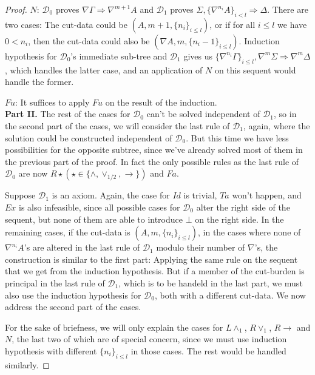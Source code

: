 \documentclass[12pt,a4paper]{article}
\begin{document}
\begin{proof}
 $N$: $\mathcal{D}_0$ proves $\nabla \Gamma \Rightarrow \nabla^{m+1} A$ and $\mathcal{D}_1$ proves $\Sigma, \{\nabla^{n_i} A\}_{i<l} \Rightarrow \Delta$. There are two cases: The cut-data could be $(A, m+1, \{n_i\}_{i \leq l})$, or if for all $i \leq l$ we have $0 < n_i$, then the cut-data could also be $(\nabla A, m, \{n_i-1\}_{i \leq l})$. Induction hypothesis for $\mathcal{D}_0$'s immediate sub-tree and $\mathcal{D}_1$ gives us $\{\nabla^{n_i}\Gamma\}_{i \leq l}, \nabla^m \Sigma \Rightarrow \nabla^m \Delta$, which handles the latter case, and an application of $N$ on this sequent would handle the former.

 $Fu$: It suffices to apply $Fu$ on the result of the induction.\\

 \textbf{Part II.} The rest of the cases for $\mathcal{D}_0$ can't be solved independent of $\mathcal{D}_1$, so in the second part of the cases, we will consider the last rule of $\mathcal{D}_1$, again, where the solution could be constructed independent of $\mathcal{D}_0$. But this time we have less possibilities for the opposite subtree, since we've already solved most of them in the previous part of the proof. In fact the only possible rules as the last rule of $\mathcal{D}_0$ are now $R\star (\star \in \{\wedge, \vee_{1/2}, \rightarrow\})$ and $Fa$.

 Suppose $\mathcal{D}_1$ is an axiom. Again, the case for $Id$ is trivial, $Ta$ won't happen, and $Ex$ is also infeasible, since all possible cases for $\mathcal{D}_0$ alter the right side of the sequent, but none of them are able to introduce $\bot$ on the right side.
 In the remaining cases, if the cut-data is $(A, m, \{n_i\}_{i \leq l})$, in the cases where none of $\nabla^{n_i} A$'s are altered in the last rule of $\mathcal{D}_1$ modulo their number of $\nabla$'s, the construction is similar to the first part: Applying the same rule on the sequent that we get from the induction hypothesis. But if a member of the cut-burden is principal in the last rule of $\mathcal{D}_1$, which is to be handeld in the last part, we must also use the induction hypothesis for $\mathcal{D}_0$, both with a different cut-data. We now address the second part of the cases.
 
 For the sake of briefness, we will only explain the cases for $L \wedge_1$, $R \vee_1$, $R \rightarrow$ and $N$, the last two of which are of special concern, since we must use induction hypothesis with different $\{n_i\}_{i \leq l}$ in those cases. The rest would be handled similarly.


\end{proof}
\end{document}
